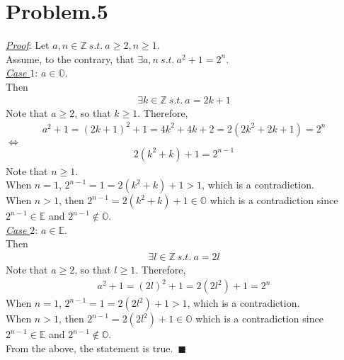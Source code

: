 \documentclass[12pt]{article}
\begin{document}
\section*{Problem.5}
\underline{\textit{Proof}}: Let $a, n \in \mathbb{Z} ~s.t.~ a \geq 2, n \geq 1$.\\[1em]
Assume, to the contrary, that $\exists a, n ~s.t.~ a^2 + 1 = 2^n$.\\[1em]
\underline{\textit{Case $1$}}: $a \in \mathbb{O}$.\\[1em]
Then
\begin{gather*}
\exists k \in \mathbb{Z} ~s.t.~ a = 2k + 1
\end{gather*}
Note that $a \geq 2$, so that $k \geq 1$. Therefore,
\begin{gather*}
a^2 + 1 = (2k + 1)^2 + 1 = 4k^2 + 4k + 2 = 2(2k^2 + 2k + 1) = 2^n
\end{gather*}
$\Leftrightarrow$
\begin{gather*}
2(k^2 + k) + 1 = 2^{n-1}
\end{gather*}
Note that $n \geq 1$.\\[1em]
When $n = 1$, $2^{n-1} = 1 = 2(k^2 + k) + 1 > 1$, which is a contradiction.\\[1em]
When $n > 1$, then $2^{n-1} = 2(k^2 + k) + 1 \in \mathbb{O}$ which is a contradiction since $2^{n-1} \in \mathbb{E}$ and $2^{n-1} \notin \mathbb{O}$.\\[1em]
\underline{\textit{Case $2$}}: $a \in \mathbb{E}$.\\[1em]
Then
\begin{gather*}
\exists l \in \mathbb{Z} ~s.t.~ a = 2l
\end{gather*}
Note that $a \geq 2$, so that $l \geq 1$. Therefore,
\begin{gather*}
a^2 + 1 = (2l)^2 + 1 = 2(2 l^2) + 1 = 2^n
\end{gather*}
When $n = 1$, $2^{n-1} = 1 = 2(2 l^2) + 1 > 1$, which is a contradiction.\\[1em]
When $n > 1$, then $2^{n-1} = 2(2 l^2) + 1 \in \mathbb{O}$ which is a contradiction since $2^{n-1} \in \mathbb{E}$ and $2^{n-1} \notin \mathbb{O}$.\\[1em]
From the above, the statement is true.~$\blacksquare$
\end{document}
